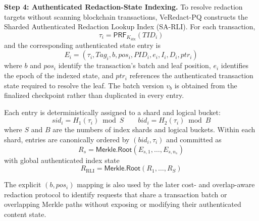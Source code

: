 \documentclass[lettersize,journal]{IEEEtran}
\begin{document}
\medskip
\noindent\textbf{Step 4: Authenticated Redaction-State Indexing.}
To resolve redaction targets without scanning blockchain transactions,
VeRedact-PQ constructs the Sharded Authenticated Redaction Lookup Index
(SA-RLI). For each transaction,
\begin{equation}
\tau_i=\mathsf{PRF}_{K_{\mathrm{idx}}}(TID_i)
\end{equation}
and the corresponding authenticated state entry is
\begin{equation}
E_i=
(\tau_i,Tag_i,b,pos_i,PID_i,e_i,I_i,D_i,ptr_i)
\end{equation}
where $b$ and $pos_i$ identify the transaction's batch and leaf
position, $e_i$ identifies the epoch of the indexed state, and $ptr_i$
references the authenticated transaction state required to resolve the
leaf. The batch version $v_b$ is obtained from the finalized checkpoint
rather than duplicated in every entry.

Each entry is deterministically assigned to a shard and logical bucket:
\begin{equation}
sid_i=H_1(\tau_i)\bmod S
\qquad
bid_i=H_2(\tau_i)\bmod B
\end{equation}
where $S$ and $B$ are the numbers of index shards and logical buckets.
Within each shard, entries are canonically ordered by
$(bid_i,\tau_i)$ and committed as
\begin{equation}
R_s=
\mathsf{Merkle.Root}(E_{s,1},\ldots,E_{s,n_s})
\end{equation}
with global authenticated index state
\begin{equation}
R_{\mathrm{RLI}}
=
\mathsf{Merkle.Root}(R_1,\ldots,R_S)
\end{equation}

The explicit $(b,pos_i)$ mapping is also used by the later
cost- and overlap-aware redaction protocol to identify requests that
share a transaction batch or overlapping Merkle paths without exposing
or modifying their authenticated content state.
\end{document}
